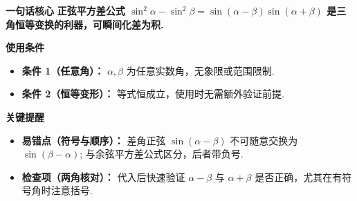 \begin{summarybox}
\textbf{\textcolor{CSummary}{一句话核心}}  
\textbf{正弦平方差公式 $\sin^2\alpha - \sin^2\beta = \sin(\alpha-\beta)\sin(\alpha+\beta)$ 是三角恒等变换的利器，可瞬间化差为积.}

\medskip
\textbf{\textcolor{CSummary}{使用条件}}
\begin{itemize}[leftmargin=*, itemsep=0.5em, topsep=0.4em]
    \item \textbf{条件 1（任意角）：} $\alpha,\beta$ 为任意实数角，无象限或范围限制.
    \item \textbf{条件 2（恒等变形）：} 等式恒成立，使用时无需额外验证前提.
\end{itemize}

\medskip
\textbf{\textcolor{CSummary}{关键提醒}}
\begin{itemize}[leftmargin=*, itemsep=0.5em, topsep=0.4em]
    \item \textbf{易错点（符号与顺序）：} 差角正弦 $\sin(\alpha-\beta)$ 不可随意交换为 $\sin(\beta-\alpha)$; 与余弦平方差公式区分，后者带负号.
    \item \textbf{检查项（两角核对）：} 代入后快速验证 $\alpha-\beta$ 与 $\alpha+\beta$ 是否正确，尤其在有符号角时注意括号.
\end{itemize}
\end{summarybox}
